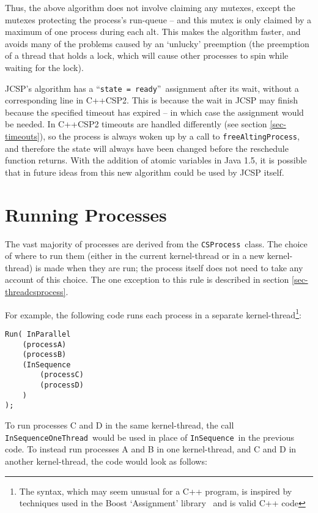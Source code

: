 \documentclass[12pt]{IOS-Book-Article-CPA-2007}
\newcommand{\code}[1]{{\small\texttt{#1}}}
\begin{document}
Thus, the above algorithm does not involve claiming any mutexes, except the mutexes protecting the process's run-queue -- and this mutex is only claimed
by a maximum of one process during each alt.  This makes the algorithm faster, and avoids many of the problems caused by an `unlucky' preemption (the preemption
of a thread that holds a lock, which will cause other processes to spin while waiting for the lock).

JCSP's algorithm has a ``\code{state = ready}''~assignment after its wait, without a corresponding line in C++CSP2.  This is because the wait in JCSP may 
finish because the specified timeout has expired -- in which case the assignment would be needed.  In C++CSP2 timeouts are handled differently (see 
section \ref{sec-timeouts}), so the process is always woken up by a call to \code{freeAltingProcess}, and therefore the state will always have been 
changed before the reschedule function returns.
With the addition of atomic variables in Java 1.5, it is possible that in future ideas from this new algorithm could be used by JCSP itself.

\section{Running Processes}

\label{sec-run}

The vast majority of processes are derived from the \code{CSProcess}~class.  The choice of where to run them (either in the current kernel-thread or 
in a new kernel-thread)
is made when they are run; the process itself does not need to take any account of this choice.  
The one exception to this rule is described in section \ref{sec-threadcsprocess}.

For example, the following code runs each process in a separate kernel-thread\footnote{The syntax, which may seem unusual for a C++
program, is inspired by techniques used in the Boost `Assignment' library \cite{web-boost-assign}~and is valid C++ code}:

{\small\begin{verbatim}
Run( InParallel
    (processA)
    (processB)
    (InSequence
        (processC)
        (processD)
    )
);
\end{verbatim}}

To run processes C and D in the same kernel-thread, the call \code{InSequenceOneThread}~would be used in place of \code{InSequence}~in the previous code.
To instead run processes A and B in one kernel-thread, and C and D in another kernel-thread, the code would look as follows:
\end{document}
